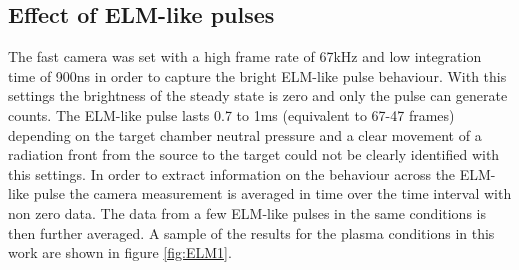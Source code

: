 \subsection{Effect of ELM-like pulses}\label{Effect of ELM-like pulses}

The fast camera was set with a high frame rate of 67kHz and low integration time of 900ns in order to capture the bright ELM-like pulse behaviour. With this settings the brightness of the steady state is zero and only the pulse can generate counts. The ELM-like pulse lasts 0.7 to 1ms (equivalent to 67-47 frames) depending on the target chamber neutral pressure and a clear movement of a radiation front from the source to the target could not be clearly identified with this settings. In order to extract information on the behaviour across the ELM-like pulse the camera measurement is averaged in time over the time interval with non zero data. The data from a few ELM-like pulses in the same conditions is then further averaged. A sample of the results for the plasma conditions in this work are shown in figure \autoref{fig:ELM1}.

